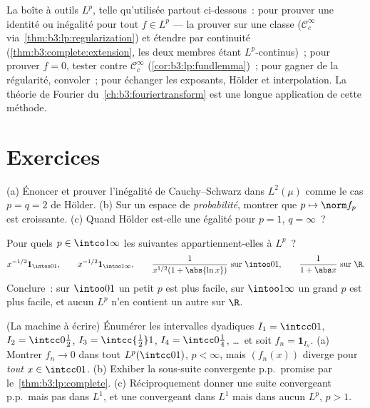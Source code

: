 \begin{method}\label{met:b3:lp:toolkit}
La boîte à outils $L^p$, telle qu'utilisée partout
ci-dessous~: pour prouver une identité ou inégalité pour tout
$f \in L^p$ --- la prouver sur une classe  ($\mathcal
C_c^\infty$ via~\cref{thm:b3:lp:regularization}) et étendre
par continuité (\cref{thm:b3:complete:extension}, les deux
membres étant $L^p$-continus)~; pour prouver $f = 0$, tester
contre $\mathcal C_c^\infty$ (\cref{cor:b3:lp:fundlemma})~;
pour gagner de la régularité, convoler~; pour échanger les
exposants, Hölder et interpolation. La théorie de Fourier
du~\cref{ch:b3:fouriertransform} est une longue application de
cette méthode.
\end{method}

\section{Exercices}

\begin{exercise}[$\star$]\label{exo:b3:lp:1}
(a) Énoncer et prouver l'inégalité de Cauchy--Schwarz dans
$L^2(\mu)$ comme le cas $p = q = 2$ de Hölder.
(b) Sur un espace de \emph{probabilité}, montrer que $p
\mapsto \norm f_p$ est croissante.
(c) Quand Hölder est-elle une égalité pour $p = 1$, $q =
\infty$~?
\end{exercise}

\begin{exercise}[$\star$]\label{exo:b3:lp:2}
Pour quels $p \in \intco1\infty$ les suivantes appartiennent-elles
à $L^p$~?
\[
x^{-1/2}\mathbf 1_{\intoo01},\qquad
x^{-1/2}\mathbf 1_{\intoo1\infty},\qquad
\frac{1}{x^{1/2}(1 + \abs{\ln x})}\ \text{sur } \intoo01,
\qquad
\frac1{1 + \abs x}\ \text{sur } \R .
\]
Conclure~: sur $\intoo01$ un petit $p$ est plus facile, sur
$\intoo1\infty$ un grand $p$ est plus facile, et aucun $L^p$
n'en contient un autre sur $\R$.
\end{exercise}

\begin{exercise}[$\star\star$]\label{exo:b3:lp:3}
(La machine à écrire) Énumérer les intervalles dyadiques $I_1
= \intcc01$, $I_2 = \intcc0{\frac12}$, $I_3 =
\intcc{\frac12}1$, $I_4 = \intcc0{\frac14}$, \dots\ et soit
$f_n = \mathbf 1_{I_n}$.
(a) Montrer $f_n \to 0$ dans tout $L^p(\intcc01)$, $p <
\infty$, mais $(f_n(x))$ diverge pour \emph{tout} $x \in
\intcc01$.
(b) Exhiber la sous-suite convergente p.p.\ promise par
le~\cref{thm:b3:lp:complete}.
(c) Réciproquement donner une suite convergeant p.p.\ mais
pas dans $L^1$, et une convergeant dans $L^1$ mais dans
aucun $L^p$, $p > 1$.
\end{exercise}

